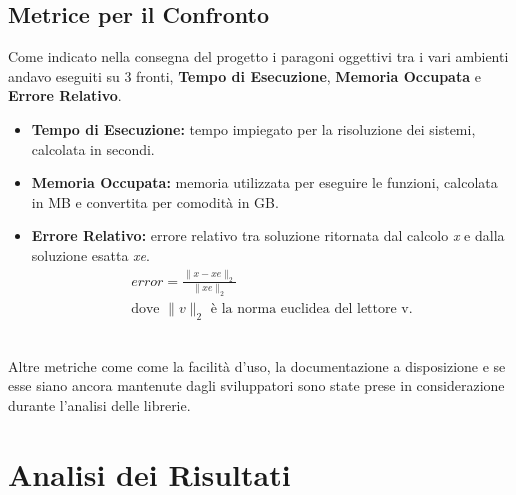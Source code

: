 \documentclass[a4paper,12pt,titlepage,oneside]{book}
\begin{document}
    \section{Metrice per il Confronto}
    \noindent Come indicato nella consegna del progetto i paragoni oggettivi tra i vari ambienti andavo eseguiti su 3 fronti, \textbf{Tempo di Esecuzione}, \textbf{Memoria Occupata} e \textbf{Errore Relativo}.
    \begin{itemize}
        \item \textbf{Tempo di Esecuzione:} tempo impiegato per la risoluzione dei sistemi, calcolata in secondi.
        
        \item \textbf{Memoria Occupata:} memoria utilizzata per eseguire le funzioni, calcolata in MB e convertita per comodità in GB.
        
        \item \textbf{Errore Relativo:} errore relativo tra soluzione ritornata dal calcolo \textit{x} e dalla soluzione esatta \textit{xe}.\\
        \begin{equation}
        \begin{aligned}
            error = \frac{\|x - xe\|_2}{\|xe\|_2}\\
            \text{dove $\|v\|_2$ è la norma euclidea del lettore v}.
        \end{aligned}
        \end{equation}
         
    \end{itemize}\\[0.5cm]
    Altre metriche come come la facilità d'uso, la documentazione a disposizione e se esse siano ancora mantenute dagli sviluppatori sono state prese in considerazione durante l'analisi delle librerie. 
    
\chapter{Analisi dei Risultati}
\end{document}
